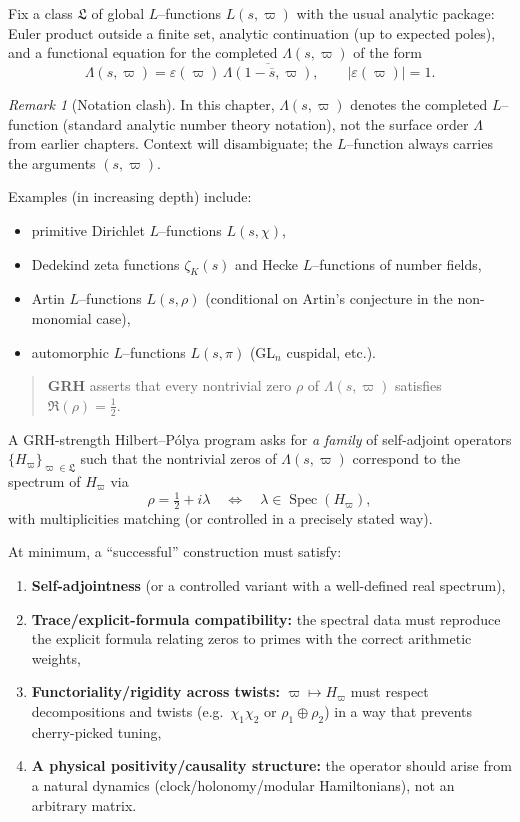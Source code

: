 \documentclass[11pt,oneside]{amsbook}
\numberwithin{equation}{section}
\theoremstyle{plain}
\theoremstyle{definition}
\theoremstyle{remark}
\newtheorem{remark}[theorem]{Remark}
\DeclareMathOperator{\Spec}{\mathrm{Spec}}
\begin{document}
Fix a class $\mathfrak{L}$ of global $L$--functions $L(s,\varpi)$ with the usual analytic package:
Euler product outside a finite set, analytic continuation (up to expected poles), and a functional equation for the completed $\Lambda(s,\varpi)$ of the form
\[
\Lambda(s,\varpi)=\varepsilon(\varpi)\,\overline{\Lambda(1-\overline{s},\varpi)},
\qquad |\varepsilon(\varpi)|=1.
\]

\begin{remark}[Notation clash]
In this chapter, $\Lambda(s,\varpi)$ denotes the completed $L$--function (standard analytic number theory notation), not the surface order $\Lambda$ from earlier chapters.  Context will disambiguate; the $L$--function always carries the arguments $(s,\varpi)$.
\end{remark}

Examples (in increasing depth) include:
\begin{itemize}
\item primitive Dirichlet $L$--functions $L(s,\chi)$,
\item Dedekind zeta functions $\zeta_K(s)$ and Hecke $L$--functions of number fields,
\item Artin $L$--functions $L(s,\rho)$ (conditional on Artin's conjecture in the non-monomial case),
\item automorphic $L$--functions $L(s,\pi)$ (GL$_n$ cuspidal, etc.).
\end{itemize}

\begin{quote}
\textbf{GRH} asserts that every nontrivial zero $\rho$ of $\Lambda(s,\varpi)$ satisfies $\Re(\rho)=\tfrac12$.
\end{quote}

A GRH-strength Hilbert--Pólya program asks for \emph{a family} of self-adjoint operators $\{H_\varpi\}_{\varpi\in\mathfrak{L}}$ such that the nontrivial zeros of $\Lambda(s,\varpi)$ correspond to the spectrum of $H_\varpi$ via
\[
\rho=\tfrac12+i\lambda \quad \Longleftrightarrow \quad \lambda\in \Spec(H_\varpi),
\]
with multiplicities matching (or controlled in a precisely stated way).

At minimum, a ``successful'' construction must satisfy:
\begin{enumerate}
\item \textbf{Self-adjointness} (or a controlled variant with a well-defined real spectrum),
\item \textbf{Trace/explicit-formula compatibility:} the spectral data must reproduce the explicit formula relating zeros to primes with the correct arithmetic weights,
\item \textbf{Functoriality/rigidity across twists:} $\varpi\mapsto H_\varpi$ must respect decompositions and twists (e.g.\ $\chi_1\chi_2$ or $\rho_1\oplus\rho_2$) in a way that prevents cherry-picked tuning,
\item \textbf{A physical positivity/causality structure:} the operator should arise from a natural dynamics (clock/holonomy/modular Hamiltonians), not an arbitrary matrix.
\end{enumerate}
\end{document}
